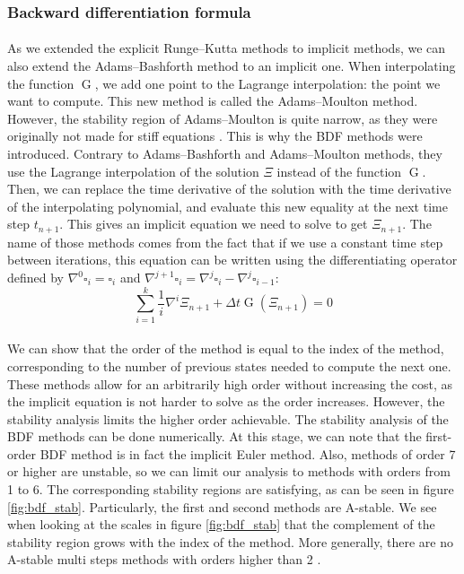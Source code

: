       \subsubsection{Backward differentiation formula}

        \paragraph{}
        As we extended the explicit Runge--Kutta methods to implicit methods, we can also extend the Adams--Bashforth method to an implicit one.
        When interpolating the function $\operatorname{G}$, we add one point to the Lagrange interpolation: the point we want to compute.
        This new method is called the Adams--Moulton method.
        However, the stability region of Adams--Moulton is quite narrow, as they were originally not made for stiff equations \cite{Iserles2008}.
        This is why the BDF methods were introduced.
        Contrary to Adams--Bashforth and Adams--Moulton methods, they use the Lagrange interpolation of the solution $\Xi$ instead of the function $\operatorname{G}$.
        Then, we can replace the time derivative of the solution with the time derivative of the interpolating polynomial, and evaluate this new equality at the next time step $t_{n+1}$.
        This gives an implicit equation we need to solve to get $\Xi_{n+1}$.
        The name of those methods comes from the fact that if we use a constant time step between iterations, this equation can be written using the differentiating operator defined by $\nabla^0 \square_i = \square_i$ and $\nabla^{j+1} \square_i = \nabla^j \square_i - \nabla^j \square_{i-1}$:
        \begin{equation}
          \sum_{i=1}^k \frac{1}{i} \nabla^i \Xi_{n+1} + \Delta t \operatorname{G}\left(\Xi_{n+1}\right) = 0
        \end{equation}

        \paragraph{}
        We can show that the order of the method is equal to the index of the method, corresponding to the number of previous states needed to compute the next one.
        These methods allow for an arbitrarily high order without increasing the cost, as the implicit equation is not harder to solve as the order increases.
        However, the stability analysis limits the higher order achievable.
        The stability analysis of the BDF methods can be done numerically.
        At this stage, we can note that the first-order BDF method is in fact the implicit Euler method.
        Also, methods of order 7 or higher are unstable, so we can limit our analysis to methods with orders from 1 to 6.
        The corresponding stability regions are satisfying, as can be seen in figure \ref{fig:bdf_stab}.
        Particularly, the first and second methods are A-stable.
        We see when looking at the scales in figure \ref{fig:bdf_stab} that the complement of the stability region grows with the index of the method.
        More generally, there are no A-stable multi steps methods with orders higher than 2 \cite{Dahlquist1963, HairerWanner1996}.

